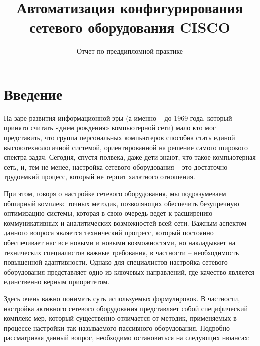 \documentclass[a4paper,14pt]{extreport}
\begin{document}
	\title{Автоматизация конфигурирования сетевого оборудования CISCO}
	\subtitle{Отчет по преддипломной практике}
	\maketitle
	\setcounter{page}{2} %
	
	\tableofcontents
	
	\chapter*{Введение}
		
	На заре развития информационной эры (а именно – до 1969 года, который принято считать «днем рождения» компьютерной сети) мало кто мог представить, что группа персональных компьютеров способна стать единой высокотехнологичной системой, ориентированной на решение самого широкого спектра задач. Сегодня, спустя полвека, даже дети знают, что такое компьютерная сеть, и, тем не менее, настройка сетевого оборудования – это достаточно трудоемкий процесс, который не терпит халатного отношения.
	
	При этом, говоря о настройке сетевого оборудования, мы подразумеваем обширный комплекс точных методик, позволяющих обеспечить безупречную оптимизацию системы, которая в свою очередь ведет к расширению коммуникативных и аналитических возможностей всей сети. Важным аспектом данного вопроса является технический прогресс, который постоянно обеспечивает нас все новыми и новыми возможностями, но накладывает на технических специалистов важные требования, в частности – необходимость повышенной адаптивности. Однако для специалистов настройка сетевого оборудования представляет одно из ключевых направлений, где качество является единственно верным приоритетом.
	
	Здесь очень важно понимать суть используемых формулировок. В частности, настройка активного сетевого оборудования представляет собой специфический комплекс мер, который существенно отличается от методик, применяемых в процессе настройки так называемого пассивного оборудования. Подробно рассматривая данный вопрос, необходимо остановиться на следующих нюансах:
	
\end{document}
